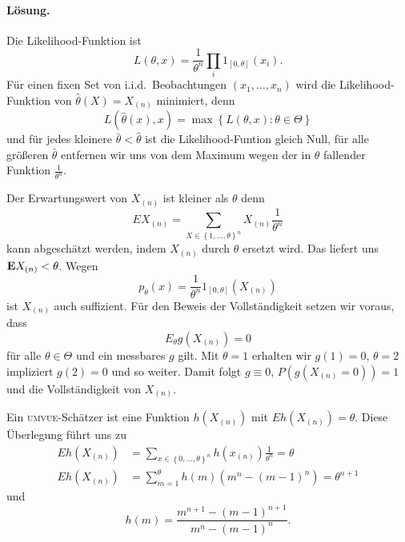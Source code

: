 \paragraph*{Lösung.}
Die Likelihood-Funktion ist
\begin{equation*}
    L(\theta,x) = \frac{1}{\theta^n} \prod_i 1_{[0,\theta]}(x_i).
\end{equation*}
Für einen fixen Set von i.i.d.\ Beobachtungen $(x_1,\ldots,x_n)$ wird die
Likelihood-Funktion von $\hat\theta(X)=X_{(n)}$ minimiert, denn
\begin{equation*}
    L(\hat\theta(x),x) = \max \left\{ L(\theta,x) : \theta\in\Theta \right\}
\end{equation*}
und für jedes kleinere $\bar\theta<\hat\theta$ ist die Likelihood-Funtion
gleich Null, für alle größeren $\bar\theta$ entfernen wir uns von dem Maximum
wegen der in $\theta$ fallender Funktion $\frac{1}{\theta^n}$.

Der Erwartungswert von $X_{(n)}$ ist kleiner als $\theta$ denn 
\begin{equation*}
    E X_{(n)} = \sum_{X\in\left\{ 1,\ldots,\theta \right\}^n}^{} X_{(n)} \frac{1}{\theta^n}
\end{equation*}
kann abgeschätzt werden, indem $X_{(n)}$ durch $\theta$ ersetzt wird. Das liefert uns
$\mathbf{E} X_{(n)} < \theta$. Wegen
\begin{equation*}
    p_\theta(x) = \frac{1}{\theta^n} 1_{[0,\theta]} \left( X_{(n)} \right)
\end{equation*}
ist $X_{(n)}$ auch suffizient. Für den Beweis der Vollständigkeit setzen wir voraus, dass 
\begin{equation*}
    E_{\theta} g(X_{(n)}) =0
\end{equation*}
für alle $\theta\in\Theta$ und ein messbares $g$ gilt.  Mit $\theta=1$ erhalten
wir $g(1)=0$, $\theta=2$ impliziert $g(2)=0$ und so weiter. Damit folgt $g
\equiv 0$, $P( g(X_{(n)} =0))=1$ und die Vollständigkeit von $X_{(n)}$.

Ein \textsc{umvue}-Schätzer ist eine Funktion $h(X_{(n)})$ mit $E h(X_{(n)})=\theta$.
Diese Überlegung führt uns zu
\begin{align*}
    E h(X_{(n)}) &= 
    \sum_{x\in \left\{ 0,\ldots,\theta \right\}^n } h(x_{(n)}) \frac{1}{\theta^n} = \theta \\
    E h(X_{(n)}) &= \sum_{m=1}^{\theta} h(m)(m^n - (m-1)^n) = \theta^{n+1}
\end{align*}
und
\begin{equation*}
    h(m) = \frac{m^{n+1} - (m-1)^{n+1}}{m^n - (m-1)^{n}}.
\end{equation*}



